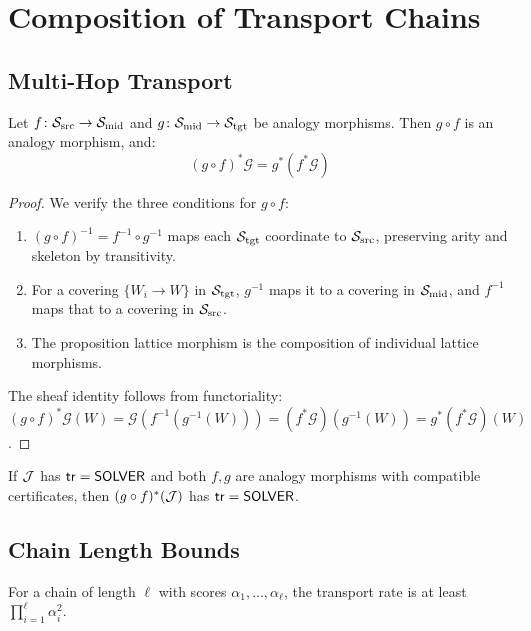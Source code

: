 \documentclass[11pt]{article}
\newcommand{\SourceSite}{\Site_{\mathrm{src}}}
\newcommand{\TargetSite}{\Site_{\mathrm{tgt}}}
\newcommand{\AnalogyScore}{\alpha}
\newcommand{\tr}{\mathsf{tr}}
\begin{document}
\section{Composition of Transport Chains}\label{sec:composition}

\subsection{Multi-Hop Transport}

\begin{theorem}\label{thm:composition}
Let $f \colon \SourceSite \to \Site_{\mathrm{mid}}$ and
$g \colon \Site_{\mathrm{mid}} \to \TargetSite$ be analogy morphisms.
Then $g \circ f$ is an analogy morphism, and:
\[
  (g \circ f)^{*}\mathcal{G} = g^{*}(f^{*}\mathcal{G})
\]
\end{theorem}

\begin{proof}
We verify the three conditions for $g \circ f$:
\begin{enumerate}[noitemsep]
  \item $(g \circ f)^{-1} = f^{-1} \circ g^{-1}$ maps each
        $\TargetSite$ coordinate to $\SourceSite$, preserving arity
        and skeleton by transitivity.
  \item For a covering $\{W_i \to W\}$ in $\TargetSite$,
        $g^{-1}$ maps it to a covering in $\mathcal{S}_{\mathrm{mid}}$,
        and $f^{-1}$ maps that to a covering in $\SourceSite$.
  \item The proposition lattice morphism is the composition of
        individual lattice morphisms.
\end{enumerate}
The sheaf identity follows from functoriality:
$(g \circ f)^{*}\mathcal{G}(W) = \mathcal{G}(f^{-1}(g^{-1}(W))) =
(f^{*}\mathcal{G})(g^{-1}(W)) = g^{*}(f^{*}\mathcal{G})(W)$.
\end{proof}

\begin{corollary}\label{cor:trust-compose}
If $\mathcal{J}$ has $\tr = \Tsolver$ and both $f, g$ are analogy morphisms with
compatible certificates, then $(g \circ f)^{*}(\mathcal{J})$ has $\tr = \Tsolver$.
\end{corollary}

\subsection{Chain Length Bounds}

\begin{proposition}\label{prop:degrade}
For a chain of length $\ell$ with scores $\AnalogyScore_1, \ldots,
\AnalogyScore_\ell$, the transport rate is at least
$\prod_{i=1}^{\ell} \AnalogyScore_i^2$.
\end{proposition}
\end{document}
